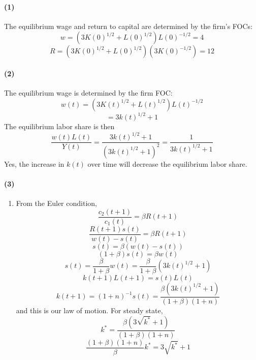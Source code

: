 \documentclass[10pt,letter]{article}
\newcommand{\problempart}[1]{\paragraph{#1}}
\begin{document}
\problempart{(1)}
The equilibrium wage and return to capital are determined by the firm's FOCs:
\[w = (3K(0)^{1/2} + L(0)^{1/2})L(0)^{-1/2} = 4 \]
\[R = (3K(0)^{1/2} + L(0)^{1/2})(3K(0)^{-1/2}) = 12 \]
\problempart{(2)}
The equilibrium wage is determined by the firm FOC:
\[ w(t) = (3K(t)^{1/2} + L(t)^{1/2})L(t)^{-1/2} \]
\[ = 3k(t)^{1/2} + 1 \]
The equilibrium labor share is then
\[ \frac{w(t)L(t)}{Y(t)} = \frac{3k(t)^{1/2} + 1}{(3k(t)^{1/2} + 1)^2} = \frac{1}{3k(t)^{1/2} + 1} \]
Yes, the increase in $k(t)$ over time will decrease the equilibrium labor share.
\problempart{(3)}
\begin{enumerate} [label=(\alph*)]
  \item From the Euler condition,
  \[ \frac{c_2(t+1)}{c_1(t)} = \beta R(t+1) \]
  \[ \frac{R(t+1)s(t)}{w(t) - s(t)} = \beta R(t+1) \]
  \[ s(t) = \beta (w(t) - s(t)) \]
  \[ (1+\beta)s(t) = \beta w(t) \]
  \[ s(t) = \frac{\beta}{1+ \beta} w(t) = \frac{\beta}{1+ \beta}\left(3k(t)^{1/2} + 1 \right) \]
  \[ k(t+1)L(t+1) = s(t)L(t) \]
  \[ k(t+1) = (1+n)^{-1} s(t) = \frac{\beta\left(3k(t)^{1/2} + 1 \right)}{(1+ \beta)(1+n)} \]
  and this is our law of motion. For steady state,
  \[ k^* = \frac{\beta\left(3\sqrt{k^*} + 1 \right)}{(1+ \beta)(1+n)} \]
  \[ \frac{(1+ \beta)(1+n)} {\beta} k^* = 3\sqrt{k^*} + 1  \]


\end{enumerate}
\end{document}

